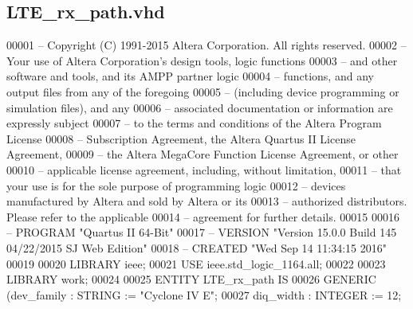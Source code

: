 \subsection{L\+T\+E\+\_\+rx\+\_\+path.\+vhd}
\label{LTE__rx__path_8vhd_source}

\begin{DoxyCode}
00001 \textcolor{keyword}{-- Copyright (C) 1991-2015 Altera Corporation. All rights reserved.}
00002 \textcolor{keyword}{-- Your use of Altera Corporation's design tools, logic functions }
00003 \textcolor{keyword}{-- and other software and tools, and its AMPP partner logic }
00004 \textcolor{keyword}{-- functions, and any output files from any of the foregoing }
00005 \textcolor{keyword}{-- (including device programming or simulation files), and any }
00006 \textcolor{keyword}{-- associated documentation or information are expressly subject }
00007 \textcolor{keyword}{-- to the terms and conditions of the Altera Program License }
00008 \textcolor{keyword}{-- Subscription Agreement, the Altera Quartus II License Agreement,}
00009 \textcolor{keyword}{-- the Altera MegaCore Function License Agreement, or other }
00010 \textcolor{keyword}{-- applicable license agreement, including, without limitation, }
00011 \textcolor{keyword}{-- that your use is for the sole purpose of programming logic }
00012 \textcolor{keyword}{-- devices manufactured by Altera and sold by Altera or its }
00013 \textcolor{keyword}{-- authorized distributors.  Please refer to the applicable }
00014 \textcolor{keyword}{-- agreement for further details.}
00015 
00016 \textcolor{keyword}{-- PROGRAM      "Quartus II 64-Bit"}
00017 \textcolor{keyword}{-- VERSION      "Version 15.0.0 Build 145 04/22/2015 SJ Web Edition"}
00018 \textcolor{keyword}{-- CREATED      "Wed Sep 14 11:34:15 2016"}
00019 
00020 \textcolor{vhdlkeyword}{LIBRARY }\textcolor{keywordflow}{ieee};
00021 \textcolor{vhdlkeyword}{USE }ieee.std\_logic\_1164.\textcolor{keywordflow}{all}; 
00022 
00023 \textcolor{vhdlkeyword}{LIBRARY }\textcolor{keywordflow}{work};
00024 
00025 \textcolor{keywordflow}{ENTITY }LTE_rx_path \textcolor{keywordflow}{IS} 
00026 \textcolor{keywordflow}{GENERIC} \textcolor{vhdlchar}{(}\textcolor{vhdlchar}{dev_family} \textcolor{vhdlchar}{:} \textcolor{comment}{STRING} \textcolor{vhdlchar}{:=} \textcolor{keyword}{"Cyclone IV E"};
00027         \textcolor{vhdlchar}{diq_width} \textcolor{vhdlchar}{:} \textcolor{comment}{INTEGER} \textcolor{vhdlchar}{:=} \textcolor{vhdllogic}{}\textcolor{vhdllogic}{12};

\end{DoxyCode}
